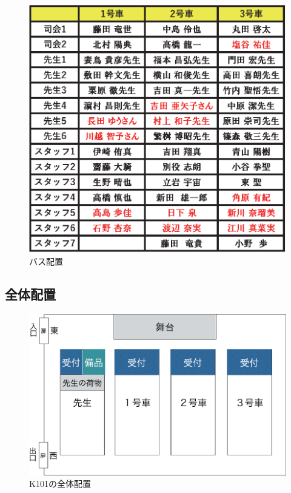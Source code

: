 \begin{figure}[H]
  \begin{center}
    \includegraphics[keepaspectratio, scale=0.9]{./04/bus_memberHaichi2.eps}
    \caption{バス配置}
    \label{fig:bus_memberHaichi2}
  \end{center}
\end{figure}

\subsection{全体配置}
\begin{figure}[H]
  \begin{center}
    \includegraphics[keepaspectratio, width=14cm]{./04/uketsuke_k101Haichi.eps}
    \caption{K101の全体配置}
    \label{fig:uketsuke_k101Haichi}
  \end{center}
\end{figure}


